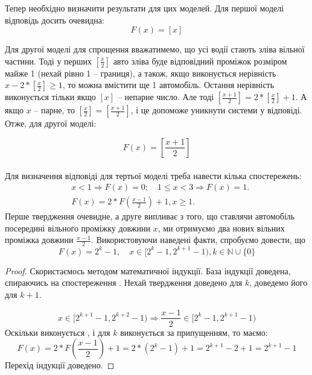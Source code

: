 Тепер необхідно визначити результати для цих моделей. Для першої моделі відповідь досить очевидна:
\begin{equation}
	\label{eq:upperbound}
	F(x)=[x]
\end{equation}

Для другої моделі для спрощення вважатимемо, що усі водії стають зліва вільної частини. Тоді у перших $[\frac x2]$ авто зліва буде відповідний проміжок розміром майже 1 (нехай рівно 1 – границя), а також, якщо виконується нерівність $x - 2 * [\frac x2] \geq 1$, то можна вмістити ще 1 автомобіль. Остання нерівність виконується тільки якщо $[x]$ – непарне число. Але тоді $[\frac{x+1}{2}] = 2 * [\frac{x}{2}] + 1$. А якщо $x$ – парне, то $[\frac{x}{2}] = [\frac{x+1}{2}]$, і це допоможе уникнути системи у відповіді. Отже, для другої моделі:

\begin{equation}
	\label{eq:lowerbound}
	F(x)=\left[\frac{x+1}{2}\right]
\end{equation}
\\
Для визначення відповіді для тертьої моделі треба навести кілька спостережень:
\begin{align}
	&x < 1 \Rightarrow F(x)=0;\quad 1 \leq x < 3 \Rightarrow F(x) = 1.\label{eq:part_case_prop1}\\
	&F(x) = 2 * F\left(\frac{x-1}{2}\right) + 1, x \geq 1.\label{eq:part_case_prop2}
\end{align}
Перше твердження очевидне, а друге випливає з того, що ставлячи автомобіль посередині вільного проміжку довжини $x$, ми отримуємо два
нових вільних проміжка довжини $\frac{x-1}{2}$. Використовуючи наведені факти,
спробуємо довести, що
\begin{equation}
	F(x) = 2^k - 1,\quad x \in [2^k - 1, 2^{k+1} - 1), k \in \mathbb{N} \cup \{0\} \label{eq:part_case_res3}
\end{equation}
\begin{proof}
	Скористаємось методом математичної індукції. База індукції доведена, спираючись на спостереження . Нехай твердження доведено для $k$, доведемо його для $k+1$.
	
	\begin{equation}
		x \in [2^{k+1} - 1, 2^{k+2} - 1) \Rightarrow \frac{x-1}{2} \in [2^k - 1, 2^{k+1} - 1)
	\end{equation}
	Оскільки виконується , і для $k$ виконується  за припущенням, то маємо:
	\begin{equation}
		F(x) = 2 * F\left(\frac{x-1}{2}\right) + 1 = 2 * (2^k - 1) + 1 = 2^{k+1} - 2 + 1 = 2^{k+1} - 1
	\end{equation}
	Перехід індукції доведено.
\end{proof}